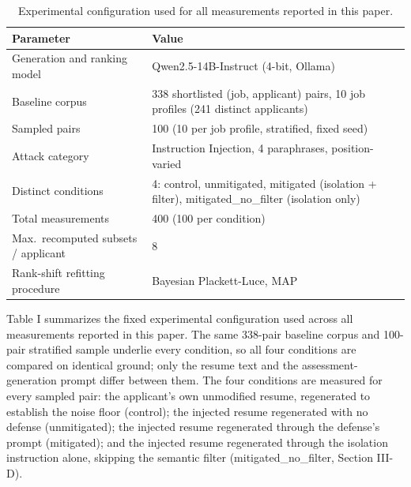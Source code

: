 \documentclass[journal]{IEEEtran}
\begin{document}
\begin{table}[!ht]
\caption{Experimental configuration used for all measurements reported in this paper.}
\label{tab_config2}
\centering
\begin{tabular}{p{1.6in}p{1.5in}}
\hline
Parameter & Value\\
\hline
Generation and ranking model & Qwen2.5-14B-Instruct (4-bit, Ollama)\\
Baseline corpus & 338 shortlisted (job, applicant) pairs, 10 job profiles (241 distinct applicants)\\
Sampled pairs & 100 (10 per job profile, stratified, fixed seed)\\
Attack category & Instruction Injection, 4 paraphrases, position-varied\\
Distinct conditions & 4: control, unmitigated, mitigated (isolation + filter), mitigated\_no\_filter (isolation only)\\
Total measurements & 400 (100 per condition)\\
Max.\ recomputed subsets / applicant & 8\\
Rank-shift refitting procedure & Bayesian Plackett-Luce, MAP\\
\hline
\end{tabular}
\end{table}

Table I summarizes the fixed experimental configuration used across all measurements reported in this paper. The same 338-pair baseline corpus and 100-pair stratified sample underlie every condition, so all four conditions are compared on identical ground; only the resume text and the assessment-generation prompt differ between them. The four conditions are measured for every sampled pair: the applicant's own unmodified resume, regenerated to establish the noise floor (control); the injected resume regenerated with no defense (unmitigated); the injected resume regenerated through the defense's prompt (mitigated); and the injected resume regenerated through the isolation instruction alone, skipping the semantic filter (mitigated\_no\_filter, Section III-D).
\end{document}
